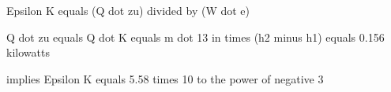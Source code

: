 Epsilon K equals (Q dot zu) divided by (W dot e)

Q dot zu equals Q dot K equals m dot 13 in times (h2 minus h1) equals 0.156 kilowatts

implies Epsilon K equals 5.58 times 10 to the power of negative 3